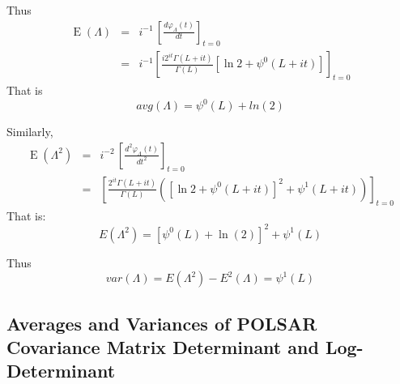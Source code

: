 \documentclass[journal]{IEEEtran}
\begin{document}
Thus
\begin{eqnarray*}
 \operatorname{E}\left(\Lambda\right) &=& i^{-1}\, \left[\frac{d\varphi_\Lambda(t)}{dt} \right]_{t=0} \,\! \\
  &=& i^{-1} \left[ \frac{i 2^{it} \Gamma(L+it)}{\Gamma(L)} \left[ \ln{2} + \psi^0(L+it) \right] \right]_{t=0}
\end{eqnarray*}
That is
\begin{equation}
  avg(\Lambda) = \psi^0(L) + ln(2)
\end{equation}

Similarly,
\begin{eqnarray*}
 \operatorname{E}\left(\Lambda^2\right) &=& i^{-2}\, \left[\frac{d^2\varphi_\Lambda(t)}{dt^2} \right]_{t=0} \,\! \\
  &=& \left[ \frac{2^{it} \Gamma(L+it)}{\Gamma(L)} \left( \left[ \ln{2} + \psi^0(L+it) \right] ^ 2 + \psi^1(L+it) \right) \right]_{t=0}  
\end{eqnarray*}
That is:
\begin{equation}
  E(\Lambda^2) = \left[ \psi^0(L)+\ln(2) \right]^2 + \psi^1(L)
\end{equation}

Thus
\begin{equation}
var(\Lambda)=E(\Lambda^2)-E^2(\Lambda)=\psi^1(L)
\end{equation}

\subsection{Averages and Variances of POLSAR Covariance Matrix Determinant and Log-Determinant}
\end{document}
